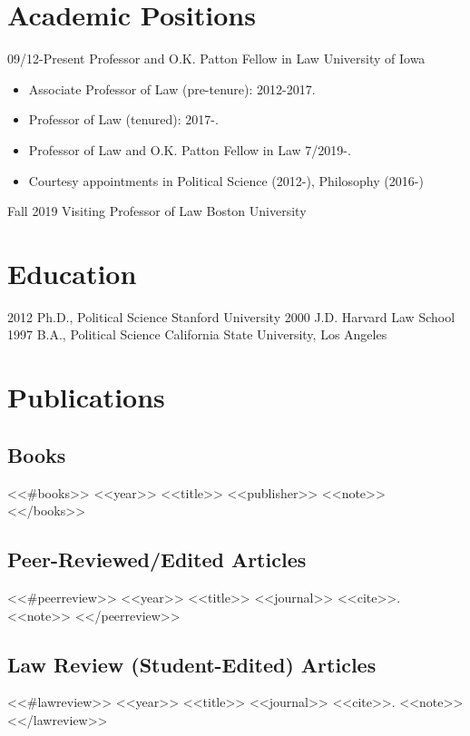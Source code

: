\documentclass[letterpaper]{moderncv}
\begin{document}
\makecvtitle

\lfoot{\thepage}

%
%
\section{Academic Positions}
\cventry
{09/12-Present}
{Professor and O.K. Patton Fellow in Law}
{University of Iowa}
{}
{}
{\begin{itemize}%
	\item Associate Professor of Law (pre-tenure): 2012-2017.
	\item Professor of Law (tenured): 2017-.
  \item Professor of Law and O.K. Patton Fellow in Law 7/2019-.
	\item Courtesy appointments in Political Science (2012-), Philosophy (2016-)
	\end{itemize}}

\cventry
{Fall 2019}
{Visiting Professor of Law}
{Boston University}
{}
{}
{}


%
%
\section{Education}
\cventry
{2012}
{Ph.D., Political Science}
{Stanford University}
{}
{}
{}
\cventry
{2000}
{J.D.}
{Harvard Law School}
{}
{}
{}
\cventry
{1997}
{B.A., Political Science}
{California State University, Los Angeles}
{}
{}
{}
%
%
\section{Publications}
\subsection{Books}
<<#books>>
\cventry
{<<year>>}
{<<title>>}
{}
{<<publisher>>}
{}
{<<note>>}
\vspace{1mm}
<</books>>
\vspace{1mm}
\subsection{Peer-Reviewed/Edited Articles}
<<#peerreview>>
\cventry
{<<year>>}
{<<title>>}
{}
{<<journal>>}
{}
{<<cite>>. <<note>>}
\vspace{1mm}
<</peerreview>>
\vspace{1mm}
\subsection{Law Review (Student-Edited) Articles}
<<#lawreview>>
\cventry
{<<year>>}
{<<title>>}
{}
{<<journal>>}
{}
{<<cite>>. <<note>>}
\vspace{1mm}
<</lawreview>>
\vspace{1mm}
\end{document}

